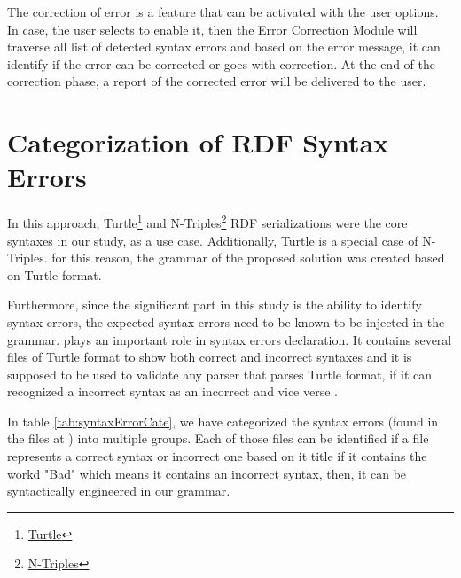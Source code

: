The correction of error is a feature that can be activated with the user options. In case, the user selects to enable it, then the Error Correction Module will traverse all list of detected syntax errors and based on the error message, it can identify if the error can be corrected or goes with correction. At the end of the correction phase, a report of the corrected error will be delivered to the user. 

\section{Categorization of RDF Syntax Errors}
 In this approach, Turtle\footnote{\href{https://www.w3.org/TR/turtle/}{Turtle}} and N-Triples\footnote{\href{https://www.w3.org/TR/n-triples/}{N-Triples}} RDF serializations were the core syntaxes in our study, as a use case. Additionally, Turtle is a special case of N-Triples. for this reason, the grammar of the proposed solution was created based on Turtle format. 
 
 Furthermore, since the significant part in this study is the ability to identify syntax errors, the expected syntax errors need to be known to be injected in the grammar. \cite{TurtleTests:Online} plays an important role in syntax errors declaration. It contains several files of Turtle format to show both correct and incorrect syntaxes and it is supposed to be used to validate any parser that parses Turtle format, if it can recognized a incorrect syntax as an incorrect and vice verse . 
 
 In table \ref{tab:syntaxErrorCate}, we have categorized the syntax errors (found in the files at \cite{TurtleTests:Online}) into multiple groups. Each of those files can be identified if a file represents a correct syntax or incorrect one based on it title if it contains the workd "Bad" which means it contains an incorrect syntax, then, it can be syntactically engineered in our grammar.  
 

